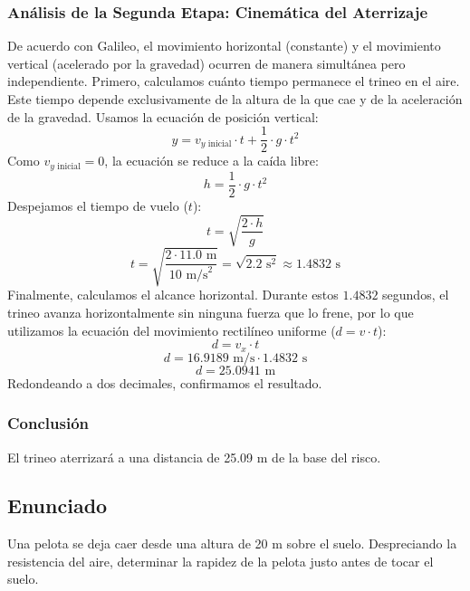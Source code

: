 \documentclass[12pt,a4paper]{article}
\begin{document}
\subsubsection*{Análisis de la Segunda Etapa: Cinemática del Aterrizaje}
De acuerdo con Galileo, el movimiento horizontal (constante) y el movimiento vertical (acelerado por la gravedad) ocurren de manera simultánea pero independiente. 
Primero, calculamos cuánto tiempo permanece el trineo en el aire. Este tiempo depende exclusivamente de la altura de la que cae y de la aceleración de la gravedad. Usamos la ecuación de posición vertical:
$$y = v_{y\text{ inicial}} \cdot t + \frac{1}{2} \cdot g \cdot t^2$$
Como $v_{y\text{ inicial}} = 0$, la ecuación se reduce a la caída libre:
$$h = \frac{1}{2} \cdot g \cdot t^2$$
Despejamos el tiempo de vuelo ($t$):
$$t = \sqrt{\frac{2 \cdot h}{g}}$$
$$t = \sqrt{\frac{2 \cdot 11.0 \text{ m}}{10 \text{ m/s}^2}} = \sqrt{2.2 \text{ s}^2} \approx 1.4832 \text{ s}$$
Finalmente, calculamos el alcance horizontal. Durante estos $1.4832$ segundos, el trineo avanza horizontalmente sin ninguna fuerza que lo frene, por lo que utilizamos la ecuación del movimiento rectilíneo uniforme ($d = v \cdot t$):
$$d = v_x \cdot t$$
$$d = 16.9189 \text{ m/s} \cdot 1.4832 \text{ s}$$
$$d = 25.0941 \text{ m}$$
Redondeando a dos decimales, confirmamos el resultado.

\subsubsection*{Conclusión}
El trineo aterrizará a una distancia de 25.09 m de la base del risco.

\newpage

\subsection*{Enunciado}
Una pelota se deja caer desde una altura de 20 m sobre el suelo. Despreciando la resistencia del aire, determinar la rapidez de la pelota justo antes de tocar el suelo.

\begin{center}
\end{center}
\end{document}
